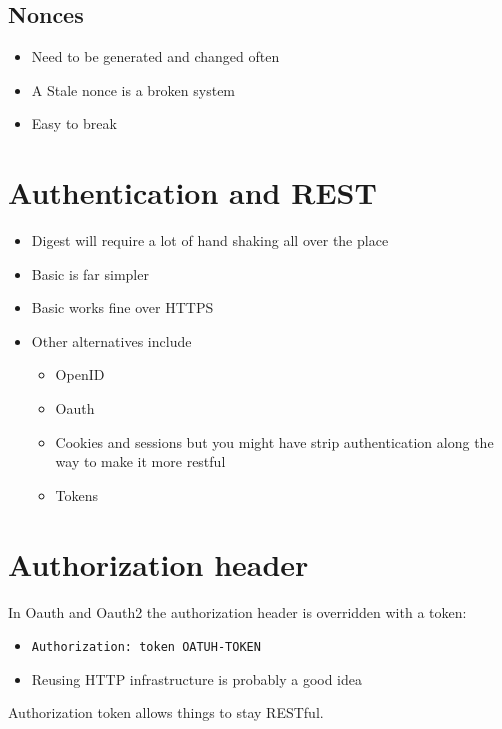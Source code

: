 \documentclass[../CMPUT-404-Notes.tex]{subfiles}
\begin{document}
\subsection{Nonces}
\begin{itemize}
  \item Need to be generated and changed often
  \item A Stale nonce is a broken system
  \item Easy to break
\end{itemize}


\section{Authentication and REST}
\begin{itemize}
  \item Digest will require a lot of hand shaking all over the place
  \item Basic is far simpler
  \item Basic works fine over HTTPS
  \item Other alternatives include
  \begin{itemize}
    \item OpenID
    \item Oauth
    \item Cookies and sessions but you might have strip authentication along the way to make it more restful
    \item Tokens    
  \end{itemize}
\end{itemize}

\section{Authorization header}
In Oauth and Oauth2 the authorization header is overridden with a token:
\begin{itemize}
  \item \texttt{Authorization: token OATUH-TOKEN}
  \item Reusing HTTP infrastructure is probably a good idea
\end{itemize}
Authorization token allows things to stay RESTful.
\end{document}
